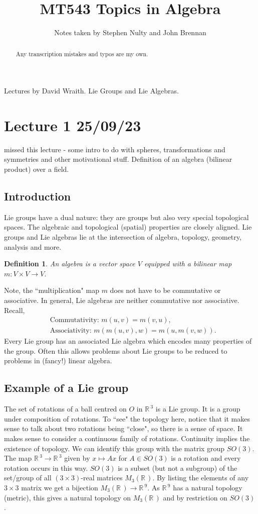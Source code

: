 \documentclass[12pt,a4paper]{article}
\title{MT543 Topics in Algebra}
\author{Notes taken by Stephen Nulty and John Brennan}
\newcommand{\rR}{\ensuremath{\mathbb{R}\,}}
\newtheorem{defn}[thm]{Definition}
\begin{document}
\maketitle
\begin{abstract}
    Any transcription mistakes and typos are my own.
\end{abstract}
Lectures by David Wraith. Lie Groups and Lie Algebras.
\section{Lecture 1 25/09/23}
missed this lecture - some intro to do with spheres, transformations and symmetries and other motivational stuff. Definition of an algebra (bilinear product) over a field.

\subsection{Introduction}

Lie groups have a dual nature: they are groups but also very special topological spaces. The algebraic and topological (spatial) properties are closely aligned. Lie groups and Lie algebras lie at the intersection of algebra, topology, geometry, analysis and more.

\begin{defn}
An algebra is a vector space $V$ equipped with a bilinear map $m:V\times V \to V$.
\end{defn}

Note, the ``multiplication" map $m$ does not have to be commutative or associative. In general, Lie algebras are neither commutative nor associative. Recall,
\begin{align*}
&\mbox{Commutativity: } m(u, v) = m(v, u), \\
&\mbox{Associativity: } m(m(u, v), w) = m(u, m(v, w)).
\end{align*}
Every Lie group has an associated Lie algebra which encodes many properties of the group. Often this allows problems about Lie groups to be reduced to problems in (fancy!) linear algebra.

\subsection*{Example of a Lie group}

The set of rotations of a ball centred on $O$ in $\rR^3$ is a Lie group. It is a group under composition of rotations. To ``see" the topology here, notice that it makes sense to talk about two rotations being ``close", so there is a sense of space. It makes sense to consider a continuous family of rotations. Continuity implies the existence of topology. We can identify this group with the matrix group $SO(3)$. The map $\rR^3 \to \rR^3$ given by $x \mapsto Ax$ for $A \in SO(3)$ is a rotation and every rotation occurs in this way. $SO(3)$ is a subset (but not a subgroup) of the set/group of all $(3\times 3)$-real matrices $M_3(\rR)$. By listing the elements of any $3\times 3$ matrix we get a bijection $M_3(\rR) \to \rR^9$. As $\rR^9$ has a natural topology (metric), this gives a natural topology on $M_3(\rR)$ and by restriction on $SO(3)$.
\end{document}
